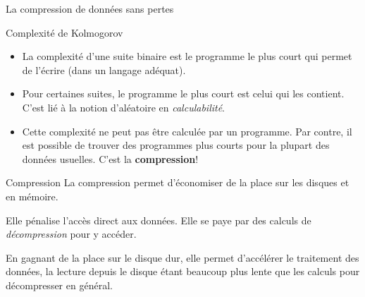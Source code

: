 \begin{frame}{La compression de données sans pertes}
  \begin{block}{Complexité de Kolmogorov}
    \begin{itemize}
    \item[\ddialoginformation] La complexité d'une suite binaire est le
      programme le plus court qui permet de l'écrire (dans un langage
      adéquat).
      
    \item[\ddialogwarning] Pour certaines suites, le programme le plus court
      est celui qui les contient. C'est lié à la notion d'aléatoire en
      \emph{calculabilité}.

    \item[\ddialogerror] Cette complexité ne peut pas être calculée par un
      programme. Par contre, il est possible de trouver des programmes plus
      courts pour la plupart des données usuelles. C'est la
      \textbf{compression}!
    \end{itemize}
  \end{block}
  \begin{block}{Compression}
    La compression permet d'économiser de la place sur les disques et en
    mémoire.

    Elle pénalise l'accès direct aux données. Elle se paye par des calculs de
    \emph{décompression} pour y accéder.

    En gagnant de la place sur le disque dur, elle permet d'accélérer le
    traitement des données, la lecture depuis le disque étant beaucoup plus
    lente que les calculs pour décompresser en général.
  \end{block}
\end{frame}
